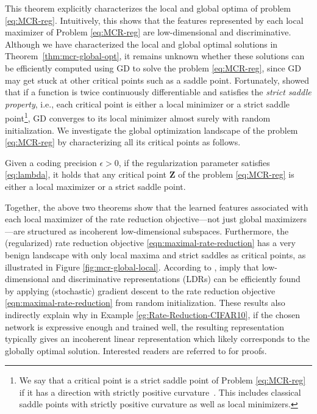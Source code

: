 \documentclass[../../book-main.tex]{subfiles}
\begin{document}
This theorem explicitly characterizes the local and global optima of problem \eqref{eq:MCR-reg}. Intuitively, this shows that the features represented by each local maximizer of Problem \eqref{eq:MCR-reg} are low-dimensional and discriminative. Although we have characterized the local and global optimal solutions in Theorem~\ref{thm:mcr-global-opt}, it remains unknown whether these solutions can be efficiently computed using GD to solve the problem \eqref{eq:MCR-reg}, since GD may get stuck at other critical points such as a saddle point.
Fortunately, \cite{sun2015nonconvex,lee2016gradient} showed that if a function is twice continuously differentiable and satisfies the {\em strict saddle property}, i.e., each critical point is either a local minimizer or a strict saddle point\footnote{We say that a critical point is a strict saddle point of Problem \eqref{eq:MCR-reg} if it has a direction with strictly positive curvature~\cite{sun2015nonconvex}. This includes classical saddle points with strictly positive curvature as well as local minimizers.}, GD converges to its local minimizer almost surely with random initialization. We investigate the global optimization landscape of the problem \eqref{eq:MCR-reg} by characterizing all its critical points as follows.

 \begin{theorem}\label{thm:mcr-benign-opt-landscape}
	Given a coding precision $\epsilon > 0$, if the regularization parameter satisfies \eqref{eq:lambda},
	it holds that any critical point $\bm Z$ of the problem \eqref{eq:MCR-reg} is either a local maximizer or a strict saddle point.
\end{theorem}
Together, the above two theorems
show that the learned features associated with each local maximizer of the rate
reduction objective---not just global maximizers---are structured as incoherent low-dimensional subspaces. Furthermore, the (regularized) rate reduction objective \eqref{eqn:maximal-rate-reduction} has a very benign landscape with only local maxima and strict saddles as critical points, as illustrated in Figure \ref{fig:mcr-global-local}. 
According to \cite{sun2015nonconvex,lee2016gradient},  imply that low-dimensional and discriminative representations (LDRs) can be efficiently found by applying (stochastic) gradient descent to the rate reduction objective \eqref{eqn:maximal-rate-reduction} from random initialization. These results also indirectly explain why in Example \ref{eg:Rate-Reduction-CIFAR10}, if the chosen network is expressive enough and trained well, the resulting representation typically gives an incoherent linear representation which likely corresponds to the globally optimal solution.
Interested readers are referred to \cite{wang2024global} for proofs. 
\end{document}
